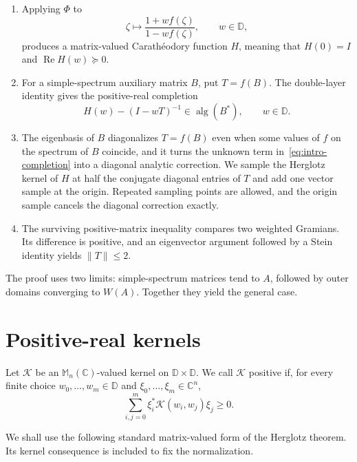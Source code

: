 \documentclass[preprints,article,submit,oneauthor]{Definitions/mdpi}
\theoremstyle{mdpi}
\theoremstyle{definition}
\newcommand{\C}{\mathbb C}
\newcommand{\D}{\mathbb D}
\newcommand{\Mn}{\mathbb M_n(\C)}
\newcommand{\alg}{\operatorname{alg}}
\newcommand{\RePart}{\operatorname{Re}}
\begin{document}
\begin{enumerate}
\item Applying $\Phi$ to
\[
  \zeta\longmapsto\frac{1+w f(\zeta)}{1-w f(\zeta)},
  \qquad w\in\D,
\]
produces a matrix-valued Carath\'eodory function $H$, meaning that
$H(0)=I$ and $\RePart H(w)\succeq0$.

\item For a simple-spectrum auxiliary matrix $B$, put $T=f(B)$.  The
double-layer identity gives the positive-real completion
\begin{equation}
  H(w)-(I-wT)^{-1}\in\alg(B^*),\qquad w\in\D.
  \label{eq:intro-completion}
\end{equation}

\item The eigenbasis of $B$ diagonalizes $T=f(B)$ even when some values
of $f$ on the spectrum of $B$ coincide, and it turns the unknown term
in~\eqref{eq:intro-completion} into a diagonal analytic correction.  We
sample the Herglotz kernel of $H$ at half the conjugate diagonal entries
of $T$ and add one vector sample at the origin.  Repeated sampling
points are allowed, and the origin sample cancels the diagonal
correction exactly.

\item The surviving positive-matrix inequality compares two weighted
Gramians.  Its difference is positive, and an eigenvector argument
followed by a Stein identity yields $\lVert T\rVert\leq2$.
\end{enumerate}

The proof uses two limits: simple-spectrum matrices tend to $A$,
followed by outer domains converging to $W(A)$.  Together they yield
the general case.

\section{Positive-real kernels}
\label{sec:herglotz}

Let $\mathcal K$ be an $\Mn$-valued kernel on $\D\times\D$.  We call
$\mathcal K$ positive if, for every finite choice
$w_0,\ldots,w_m\in\D$ and $\xi_0,\ldots,\xi_m\in\C^n$,
\begin{equation}
  \sum_{i,j=0}^m
  \xi_i^*\mathcal K(w_i,w_j)\xi_j\geq0.
  \label{eq:positive-kernel-definition}
\end{equation}

We shall use the following standard matrix-valued form of the Herglotz
theorem.  Its kernel consequence is included to fix the normalization.
\end{document}

